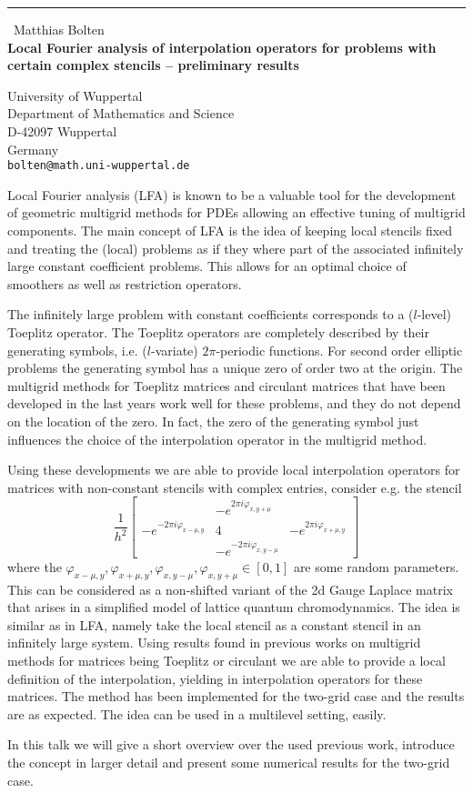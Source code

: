 \documentclass{report}
\begin{document}
\begin{center}
\rule{6in}{1pt} \
{\large Matthias Bolten \\
{\bf Local Fourier analysis of interpolation operators for problems with certain complex stencils -- preliminary results}}

University of Wuppertal \\ Department of Mathematics and Science \\ D-42097 Wuppertal \\ Germany
\\
{\tt bolten@math.uni-wuppertal.de}\end{center}

Local Fourier analysis (LFA) is known to be a valuable tool for the
development of geometric multigrid methods for PDEs allowing an effective
tuning of multigrid components. The main concept of LFA is the idea of
keeping local stencils fixed and treating the (local) problems as if they
where part of the associated infinitely large constant coefficient
problems. This allows for an optimal choice of smoothers as well as
restriction operators.

The infinitely large problem with constant coefficients corresponds to a
($l$-level) Toeplitz operator. The Toeplitz operators are completely
described by their generating symbols, i.e. ($l$-variate) $2
\pi$-periodic functions. For second order elliptic problems the
generating symbol has a unique zero of order two at the origin. The
multigrid methods for Toeplitz matrices and circulant matrices that have
been developed in the last years work well for these problems, and they
do not depend on the location of the zero. In fact, the zero of the
generating symbol just influences the choice of the interpolation
operator in the multigrid method.

Using these developments we are able to provide local interpolation
operators for matrices with non-constant stencils with complex entries,
consider e.g. the stencil
\begin{equation*}
\frac{1}{h^{2}} \left[ \begin{array}{ccc}
& -e^{2 \pi i \varphi_{x,y+\mu}} & \\
-e^{-2 \pi i \varphi_{x-\mu,y}} & 4 & -e^{2 \pi i \varphi_{x+\mu,y}} \\
& -e^{-2 \pi i \varphi_{x,y-\mu}} &
\end{array} \right]
\end{equation*}
where the $\varphi_{x-\mu,y}, \varphi_{x+\mu,y}, \varphi_{x,y-\mu},
\varphi_{x,y+\mu} \in [0,1]$ are some random parameters. This can be
considered as a non-shifted variant of the 2d Gauge Laplace matrix that
arises in a simplified model of lattice quantum chromodynamics. The idea
is similar as in LFA, namely take the local stencil as a constant stencil
in an infinitely large system. Using results found in previous works on
multigrid methods for matrices being Toeplitz or circulant we are able to
provide a local definition of the interpolation, yielding in
interpolation operators for these matrices. The method has been
implemented for the two-grid case and the results are as expected. The
idea can be used in a multilevel setting, easily.

In this talk we will give a short overview over the used previous work,
introduce the concept in larger detail and present some numerical results
for the two-grid case.
\end{document}
